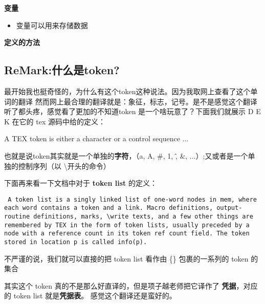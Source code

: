 \documentclass[fontset=windows]{article}
\begin{document}
\textbf{变量}\par 
\begin{itemize}
    \item 变量可以用来存储数据
\end{itemize}

\textbf{定义的方法}

\subsection{ReMark:什么是token?}

最开始我也挺奇怪的，为什么有这个token这种说法。因为我取网上查看了这个单词的翻译
然而网上最合理的翻译就是：{\ttfamily 象征，标志，记号}。是不是感觉这个翻译听了都头疼，感觉看了更加的不知道token
是一个啥玩意了？下面我们就展示 D E K 在它的 tex 源码中给的定义：

{
\ttfamily A TEX token is either a character or a control sequence ...
}

也就是说token其实就是一个单独的{\bf 字符}，（a, A, \#, 1, \^, \&, ...）;又或者是一个单独的控制序列（以 \textbackslash 开头的命令）

下面再来看一下文档中对于 {\bf token list} 的定义：

\texttt{ A token list is a singly linked list of one-word nodes in mem, where each word contains a token
and a link. Macro definitions, output-routine definitions, marks, \textbackslash   write texts, and a few other things are
remembered by TEX in the form of token lists, usually preceded by a node with a reference count in its
token ref count field. The token stored in location p is called info(p).}

不严谨的说，我们就可以直接的把 token list 看作由 \{\} 包裹的一系列的 token 的集合

其实这个 token 真的不是那么好直译的，但是项子越老师把它译作了 {\bf 凭据}，对应的 token list 就是{\bf 凭据表}。
感觉这个翻译还是蛮好的。
\end{document}
